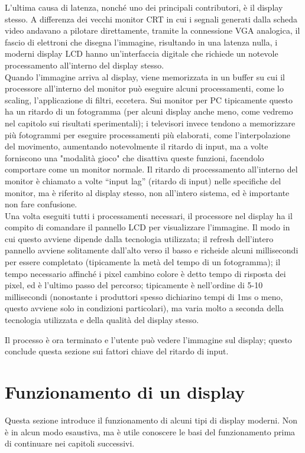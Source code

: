 L'ultima causa di latenza, nonché uno dei principali contributori, è il display stesso. A differenza dei vecchi monitor CRT in cui i segnali generati dalla scheda video andavano a pilotare direttamente, tramite la connessione VGA analogica, il fascio di elettroni che disegna l'immagine, risultando in una latenza nulla, i moderni display LCD hanno un'interfaccia digitale che richiede un notevole processamento all'interno del display stesso.\\
Quando l'immagine arriva al display, viene memorizzata in un buffer su cui il processore all'interno del monitor può eseguire alcuni processamenti, come lo scaling, l'applicazione di filtri, eccetera. Sui monitor per PC tipicamente questo ha un ritardo di un fotogramma (per alcuni display anche meno, come vedremo nel capitolo sui risultati sperimentali); i televisori invece tendono a memorizzare più fotogrammi per eseguire processamenti più elaborati, come l'interpolazione del movimento, aumentando notevolmente il ritardo di input, ma a volte forniscono una "modalità gioco" che disattiva queste funzioni, facendolo comportare come un monitor normale. Il ritardo di processamento all'interno del monitor è chiamato a volte ``input lag'' (ritardo di input) nelle specifiche del monitor, ma è riferito al display stesso, non all'intero sistema, ed è importante non fare confusione.\\
Una volta eseguiti tutti i processamenti necessari, il processore nel display ha il compito di comandare il pannello LCD per visualizzare l'immagine. Il modo in cui questo avviene dipende dalla tecnologia utilizzata; il refresh dell'intero pannello avviene solitamente dall'alto verso il basso e richeide alcuni millisecondi per essere completato (tipicamente la metà del tempo di un fotogramma); il tempo necessario affinché i pixel cambino colore è detto tempo di risposta dei pixel, ed è l'ultimo passo del percorso; tipicamente è nell'ordine di 5-10 millisecondi (nonostante i produttori spesso dichiarino tempi di 1ms o meno, questo avviene solo in condizioni particolari), ma varia molto a seconda della tecnologia utilizzata e della qualità del display stesso.

Il processo è ora terminato e l'utente può vedere l'immagine sul display; questo conclude questa sezione sui fattori chiave del ritardo di input.

\section{Funzionamento di un display}
Questa sezione introduce il funzionamento di alcuni tipi di display moderni. Non è in alcun modo esaustiva, ma è utile conoscere le basi del funzionamento prima di continuare nei capitoli successivi.

